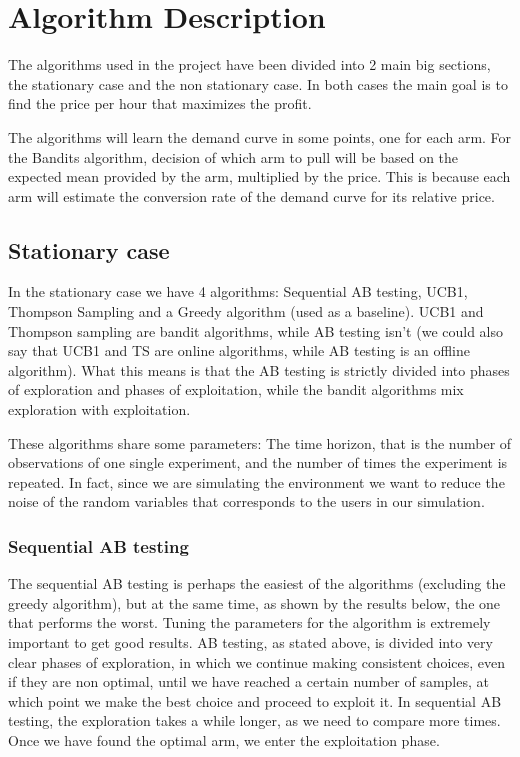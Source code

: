 \newpage
\section{Algorithm Description}\label{sec:algorithm-description}

The algorithms used in the project have been divided into 2 main big sections,
the stationary case and the non stationary case. In both cases the main goal is to find the price per hour that maximizes
the profit.

The algorithms will learn the demand curve in some points, one for each arm.
For the Bandits algorithm, decision of which arm to pull will be based on the expected mean provided by the arm,
multiplied by the price. This is because each arm will estimate the conversion rate of the demand curve for its relative price.

\subsection{Stationary case}\label{subsec:stationary-case}

In the stationary case we have 4 algorithms: Sequential AB testing, UCB1,
Thompson Sampling and a Greedy algorithm (used as a baseline). UCB1 and Thompson sampling are bandit algorithms,
while AB testing isn't (we could also say that UCB1 and TS are online algorithms, while AB testing is an offline algorithm).
What this means is that the AB testing is strictly divided into phases of exploration and phases of exploitation, while the bandit algorithms mix exploration with exploitation.

These algorithms share some parameters: The time horizon, that is the number of observations of one single experiment,
and the number of times the experiment is repeated. In fact, since we are simulating the environment we want to reduce the
noise of the random variables that corresponds to the users in our simulation.

\subsubsection{Sequential AB testing}

The sequential AB testing is perhaps the easiest of the algorithms (excluding the greedy algorithm), but at the same time,
as shown by the results below, the one that performs the worst.
Tuning the parameters for the algorithm is extremely important to get good results.
AB testing, as stated above, is divided into very clear phases of exploration, in which we continue making consistent choices,
even if they are non optimal, until we have reached a certain number of samples, at which point we make the best choice and
proceed to exploit it. In sequential AB testing, the exploration takes a while longer, as we need to compare more times.
Once we have found the optimal arm, we enter the exploitation phase.

